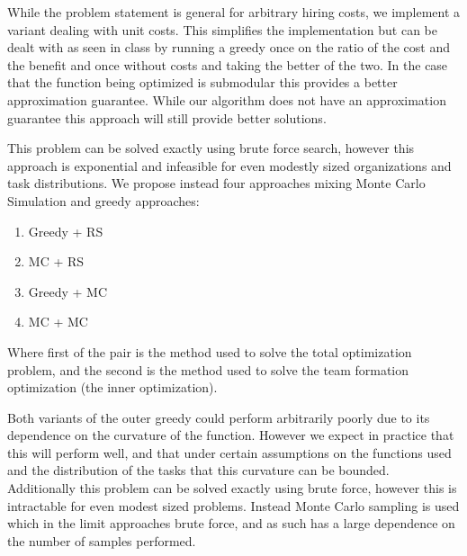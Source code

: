 While the problem statement is general for arbitrary hiring costs, we implement a variant dealing with unit costs. This simplifies the implementation but can be dealt with as seen in class by running a greedy once on the ratio of the cost and the benefit and once without costs and taking the better of the two. In the case that the function being optimized is submodular this provides a better approximation guarantee. While our algorithm does not have an approximation guarantee this approach will still provide better solutions. 

This problem can be solved exactly using brute force search, however this approach is exponential and infeasible for even modestly sized organizations and task distributions. We propose instead four approaches mixing Monte Carlo Simulation and greedy approaches: 

\begin{enumerate}
	\item Greedy + RS
	\item MC + RS
	\item Greedy + MC
	\item MC + MC
\end{enumerate}

Where first of the pair is the method used to solve the total optimization problem, and the second is the method used to solve the team formation optimization (the inner optimization).



Both variants of the outer greedy could perform arbitrarily poorly due to its dependence on the curvature of the function. However we expect in practice that this will perform well, and that under certain assumptions on the functions used and the distribution of the tasks that this curvature can be bounded. Additionally this problem can be solved exactly using brute force, however this is intractable for even modest sized problems. Instead Monte Carlo sampling is used which in the limit approaches brute force, and as such has a large dependence on the number of samples performed.  

